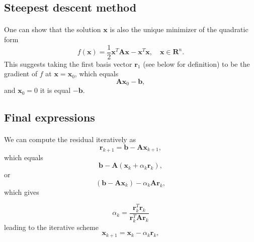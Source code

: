 \documentclass[%
oneside,                 %
final,                   %
10pt]{article}
\begin{document}
\subsection*{Steepest descent  method}

\paragraph{}
One can show that the solution $\bm{x}$ is also the unique minimizer of the quadratic form
\begin{equation*}
  f(\bm{x}) = \frac{1}{2}\bm{x}^T\bm{A}\bm{x} - \bm{x}^T \bm{x} , \quad \bm{x}\in\mathbf{R}^n. 
\end{equation*}
This suggests taking the first basis vector $\bm{r}_1$ (see below for definition) 
to be the gradient of $f$ at $\bm{x}=\bm{x}_0$, 
which equals
\begin{equation*}
\bm{A}\bm{x}_0-\bm{b},
\end{equation*}
and 
$\bm{x}_0=0$ it is equal $-\bm{b}$.



\subsection*{Final expressions}

\paragraph{}
We can compute the residual iteratively as
\begin{equation*}
\bm{r}_{k+1}=\bm{b}-\bm{A}\bm{x}_{k+1},
 \end{equation*}
which equals
\begin{equation*}
\bm{b}-\bm{A}(\bm{x}_k+\alpha_k\bm{r}_k),
 \end{equation*}
or
\begin{equation*}
(\bm{b}-\bm{A}\bm{x}_k)-\alpha_k\bm{A}\bm{r}_k,
 \end{equation*}
which gives

\[
\alpha_k = \frac{\bm{r}_k^T\bm{r}_k}{\bm{r}_k^T\bm{A}\bm{r}_k}
\]
leading to the iterative scheme
\begin{equation*}
\bm{x}_{k+1}=\bm{x}_k-\alpha_k\bm{r}_{k},
 \end{equation*}
\end{document}
